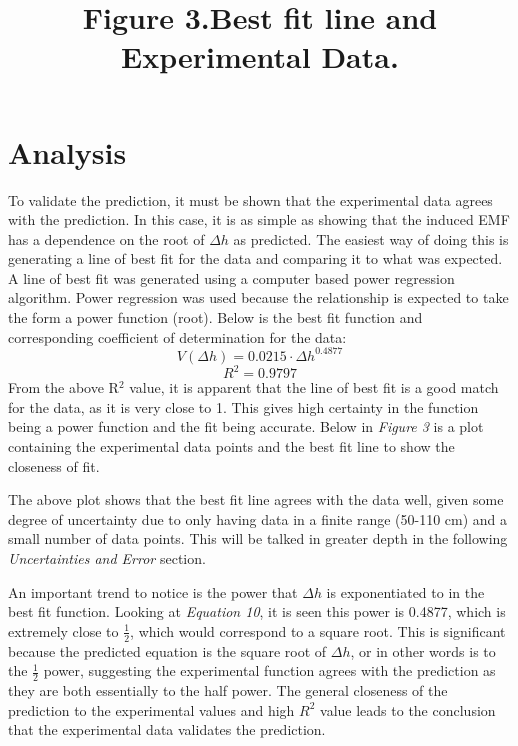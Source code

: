 \documentclass[12pt,letterpaper]{article}
\begin{document}
\section*{Analysis}
To validate the prediction, it must be shown that the experimental data agrees with the prediction. In this case, it is as simple as showing that the induced EMF has a dependence on the root of $\Delta h$ as predicted. The easiest way of doing this is generating a line of best fit for the data and comparing it to what was expected. A line of best fit was generated using a computer based power regression algorithm. Power regression was used because the relationship is expected to take the form a power function (root). Below is the best fit function and corresponding coefficient of determination for the data:
\begin{equation}
V(\Delta h) = 0.0215\cdot\Delta h^{0.4877}
\end{equation}
\begin{equation}
R^2=0.9797
\end{equation}
From the above R$^2$ value, it is apparent that the line of best fit is a good match for the data, as it is very close to 1. This gives high certainty in the function being a power function and the fit being accurate. Below in \textit{Figure 3} is a plot containing the experimental data points and the best fit line to show the closeness of fit.\vspace{6pt}\\
\title{\textbf{Figure 3.}Best fit line and Experimental Data.}
\begin{center}
    	\resizebox{0.6\textwidth}{!}{}
\end{center}
The above plot shows that the best fit line agrees with the data well, given some degree of uncertainty due to only having data in a finite range (50-110 cm) and a small number of data points. This will be talked in greater depth in the following \textit{Uncertainties and Error} section. \par
\vspace{12pt}\noindent An important trend to notice is the power that $\Delta h$ is exponentiated to in the best fit function. Looking at \textit{Equation 10}, it is seen this power is 0.4877, which is extremely close to $\frac{1}{2}$, which would correspond to a square root. This is significant because the predicted equation is the square root of $\Delta h$, or in other words is to the $\frac{1}{2}$ power, suggesting the experimental function agrees with the prediction as they are both essentially to the half power. The general closeness of the prediction to the experimental values and high $R^2$ value leads to the conclusion that the experimental data validates the prediction.
\end{document}
